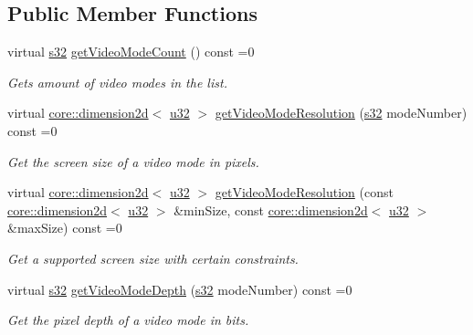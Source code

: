 \subsection*{Public Member Functions}
\begin{DoxyCompactItemize}
\item 
virtual \hyperlink{namespaceirr_ac66849b7a6ed16e30ebede579f9b47c6}{s32} \hyperlink{classirr_1_1video_1_1IVideoModeList_a84326f1c6faa1cbbb6f90bdac66714dd}{get\+Video\+Mode\+Count} () const =0
\begin{DoxyCompactList}\small\item\em Gets amount of video modes in the list. \end{DoxyCompactList}\item 
virtual \hyperlink{classirr_1_1core_1_1dimension2d}{core\+::dimension2d}$<$ \hyperlink{namespaceirr_a0416a53257075833e7002efd0a18e804}{u32} $>$ \hyperlink{classirr_1_1video_1_1IVideoModeList_af8409c756780c3566c94596cf7f94fc3}{get\+Video\+Mode\+Resolution} (\hyperlink{namespaceirr_ac66849b7a6ed16e30ebede579f9b47c6}{s32} mode\+Number) const =0
\begin{DoxyCompactList}\small\item\em Get the screen size of a video mode in pixels. \end{DoxyCompactList}\item 
virtual \hyperlink{classirr_1_1core_1_1dimension2d}{core\+::dimension2d}$<$ \hyperlink{namespaceirr_a0416a53257075833e7002efd0a18e804}{u32} $>$ \hyperlink{classirr_1_1video_1_1IVideoModeList_aa06b5905ac9c04fb38a17bf798fccc9b}{get\+Video\+Mode\+Resolution} (const \hyperlink{classirr_1_1core_1_1dimension2d}{core\+::dimension2d}$<$ \hyperlink{namespaceirr_a0416a53257075833e7002efd0a18e804}{u32} $>$ \&min\+Size, const \hyperlink{classirr_1_1core_1_1dimension2d}{core\+::dimension2d}$<$ \hyperlink{namespaceirr_a0416a53257075833e7002efd0a18e804}{u32} $>$ \&max\+Size) const =0
\begin{DoxyCompactList}\small\item\em Get a supported screen size with certain constraints. \end{DoxyCompactList}\item 
virtual \hyperlink{namespaceirr_ac66849b7a6ed16e30ebede579f9b47c6}{s32} \hyperlink{classirr_1_1video_1_1IVideoModeList_ae3f4b101eacbebe78d6a2e1a3f2e713d}{get\+Video\+Mode\+Depth} (\hyperlink{namespaceirr_ac66849b7a6ed16e30ebede579f9b47c6}{s32} mode\+Number) const =0
\begin{DoxyCompactList}\small\item\em Get the pixel depth of a video mode in bits. \end{DoxyCompactList}\item 

\end{DoxyCompactItemize}
